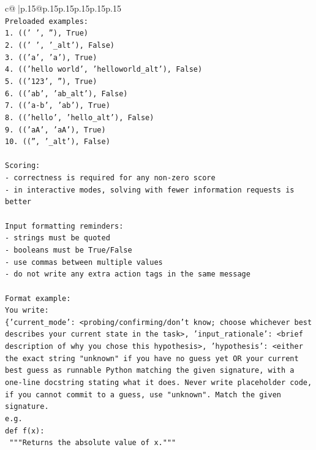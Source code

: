 \documentclass{article}
\begin{document}
{\begin{supertabular}{c@{$\;$}|p{.15\linewidth}@{}p{.15\linewidth}p{.15\linewidth}p{.15\linewidth}p{.15\linewidth}p{.15\linewidth}}
{{{\\ 
\texttt{Preloaded examples:} \\
\texttt{1. ((' ', ''), True)} \\
\texttt{2. (('   ', '\_alt'), False)} \\
\texttt{3. (('a', 'a'), True)} \\
\texttt{4. (('hello world', 'helloworld\_alt'), False)} \\
\texttt{5. (('123', ''), True)} \\
\texttt{6. (('ab', 'ab\_alt'), False)} \\
\texttt{7. (('a{-}b', 'ab'), True)} \\
\texttt{8. (('hello', 'hello\_alt'), False)} \\
\texttt{9. (('aA', 'aA'), True)} \\
\texttt{10. (('', '\_alt'), False)} \\
\\ 
\texttt{Scoring:} \\
\texttt{{-} correctness is required for any non{-}zero score} \\
\texttt{{-} in interactive modes, solving with fewer information requests is better} \\
\\ 
\texttt{Input formatting reminders:} \\
\texttt{{-} strings must be quoted} \\
\texttt{{-} booleans must be True/False} \\
\texttt{{-} use commas between multiple values} \\
\texttt{{-} do not write any extra action tags in the same message} \\
\\ 
\texttt{Format example:} \\
\texttt{You write:} \\
\texttt{\{'current\_mode': <probing/confirming/don't know; choose whichever best describes your current state in the task>, 'input\_rationale': <brief description of why you chose this hypothesis>, 'hypothesis': <either the exact string "unknown" if you have no guess yet OR your current best guess as runnable Python matching the given signature, with a one{-}line docstring stating what it does. Never write placeholder code, if you cannot commit to a guess, use "unknown". Match the given signature.} \\
\texttt{e.g.} \\
\texttt{def f(x):} \\
\texttt{	"""Returns the absolute value of x."""} \\
}}}
\end{supertabular}}
\end{document}
